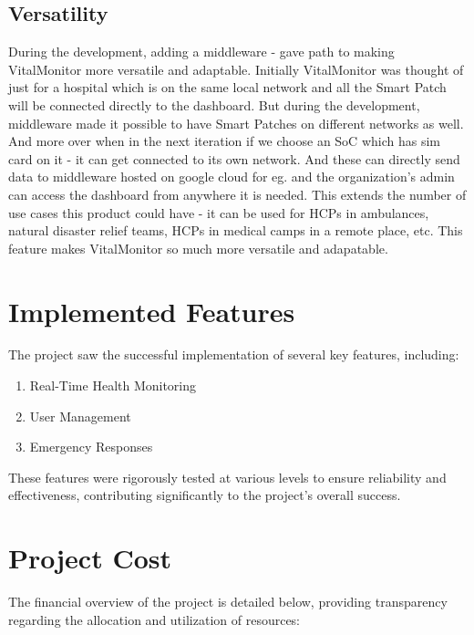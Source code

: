 \subsection{Versatility}
During the development, adding a middleware - gave path to making VitalMonitor more versatile and adaptable. Initially VitalMonitor was thought of just for a hospital which is on the same local network and all the Smart Patch will be connected directly to the dashboard. But during the development, middleware made it possible to have Smart Patches on different networks as well. And more over when in the next iteration if we choose an SoC which has sim card on it - it can get connected to its own network. And these can directly send data to middleware hosted on google cloud for eg. and the organization's admin can access the dashboard from anywhere it is needed. This extends the number of use cases this product could have - it can be used for HCPs in ambulances, natural disaster relief teams, HCPs in medical camps in a remote place, etc. This feature makes VitalMonitor so much more versatile and adapatable. 


\section{Implemented Features}

The project saw the successful implementation of several key features, including:

\begin{enumerate}
    \item Real-Time Health Monitoring
    \item User Management
    \item Emergency Responses
\end{enumerate}

These features were rigorously tested at various levels to ensure reliability and effectiveness, contributing significantly to the project's overall success.

\section{Project Cost}
The financial overview of the project is detailed below, providing transparency regarding the allocation and utilization of resources:


